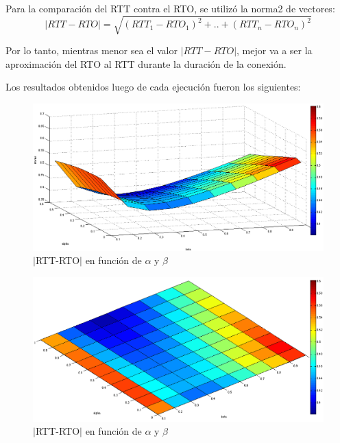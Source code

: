 \documentclass[10pt, a4paper]{article}
\begin{document}
Para la comparación del RTT contra el RTO, se utilizó la norma2 de vectores:
$$ |RTT-RTO| = \sqrt{(RTT_1-RTO_1)^2+..+(RTT_n-RTO_n)^2} $$

Por lo tanto, mientras menor sea el valor $|RTT-RTO|$, mejor va a ser la aproximación del RTO al RTT durante la duración de la conexión. 

Los resultados obtenidos luego de cada ejecución fueron los siguientes:

\begin{figure}[H]
\begin{center}
\includegraphics[width=17cm]{alphaBetaCorteCostado.png}
\caption{$|$RTT-RTO$|$ en función de $\alpha$ y $\beta$}
\end{center}
\end{figure}

\begin{figure}[H]
\begin{center}
\includegraphics[width=17cm]{alpha-beta-dif-sinCeroB.png}
\caption{$|$RTT-RTO$|$ en función de $\alpha$ y $\beta$}
\end{center}
\end{figure}
\end{document}
